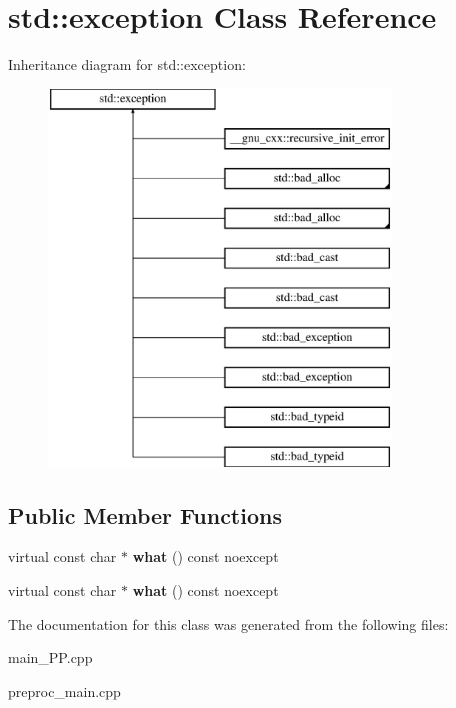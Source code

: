 \hypertarget{classstd_1_1exception}{\section{std\+:\+:exception Class Reference}
\label{classstd_1_1exception}
}
Inheritance diagram for std\+:\+:exception\+:\begin{figure}[H]
\begin{center}
\leavevmode
\includegraphics[height=10.000000cm]{classstd_1_1exception}
\end{center}
\end{figure}
\subsection*{Public Member Functions}
\begin{DoxyCompactItemize}
\item 
\hypertarget{classstd_1_1exception_a13ea7bcad59eab4379990a7322b17672}{virtual const char $\ast$ {\bfseries what} () const noexcept}\label{classstd_1_1exception_a13ea7bcad59eab4379990a7322b17672}

\item 
\hypertarget{classstd_1_1exception_a13ea7bcad59eab4379990a7322b17672}{virtual const char $\ast$ {\bfseries what} () const noexcept}\label{classstd_1_1exception_a13ea7bcad59eab4379990a7322b17672}

\end{DoxyCompactItemize}


The documentation for this class was generated from the following files\+:\begin{DoxyCompactItemize}
\item 
main\+\_\+\+P\+P.\+cpp\item 
preproc\+\_\+main.\+cpp\end{DoxyCompactItemize}
